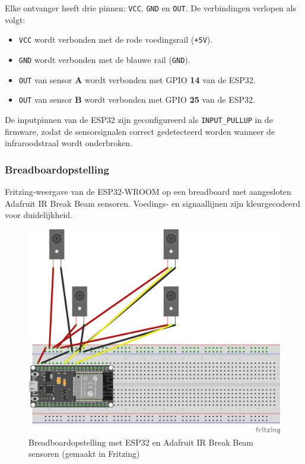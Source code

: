 Elke ontvanger heeft drie pinnen: \texttt{VCC}, \texttt{GND} en \texttt{OUT}. De verbindingen verlopen als volgt:

\begin{itemize}
    \item \texttt{VCC} wordt verbonden met de rode voedingsrail (\texttt{+5V}).
    \item \texttt{GND} wordt verbonden met de blauwe rail (\texttt{GND}).
    \item \texttt{OUT} van sensor \textbf{A} wordt verbonden met GPIO \textbf{14} van de ESP32.
    \item \texttt{OUT} van sensor \textbf{B} wordt verbonden met GPIO \textbf{25} van de ESP32.
\end{itemize}

De inputpinnen van de ESP32 zijn geconfigureerd als \texttt{INPUT\_PULLUP} in de firmware, zodat de sensorsignalen correct gedetecteerd worden wanneer de infraroodstraal wordt onderbroken.

\subsubsection{Breadboardopstelling}
Fritzing-weergave van de ESP32-WROOM op een breadboard met aangesloten Adafruit IR Break Beam sensoren. Voedings- en signaallijnen zijn kleurgecodeerd voor duidelijkheid.


\begin{figure}[htbp]
    \centering
    \includegraphics[width=\textwidth]{img/bp/wachtruimtes/technische_uitwerking/fritzing.png}
    \caption{Breadboardopstelling met ESP32 en Adafruit IR Break Beam sensoren (gemaakt in Fritzing)}
    \label{fig:breadboard}
\end{figure}

